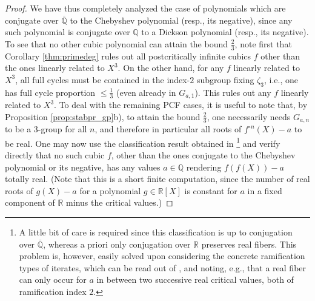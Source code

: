 \documentclass[a4paper]{amsart}
\begin{document}
\begin{proof}
  We have thus completely analyzed the case of polynomials which are conjugate over $\overline{\mathbb{Q}}$ to the Chebyshev polynomial (resp., its negative), since any such polynomial is conjugate over $\mathbb{Q}$ to a Dickson polynomial (resp., its negative). 
  To see that no other cubic polynomial can attain the bound $\frac{2}{3}$, note first that Corollary \ref{thm:primedeg} rules out all postcritically infinite  cubics $f$ other than the ones linearly related to $X^3$. On the other hand, for any $f$ linearly related to $X^3$, all full cycles must be contained in the index-$2$ subgroup fixing $\zeta_3$, i.e., one has full cycle proportion $\le \frac{1}{3}$ (even already in $G_{a,1}$). %
   This rules out any $f$ linearly related to $X^3$. To deal with the remaining PCF cases, it is useful to note that, by Proposition \ref{prop:stabpr_gp}b), to attain the bound $\frac{2}{3}$, one necessarily needs $G_{a,n}$ to be a $3$-group for all $n$, and therefore in particular all roots of $f^{\circ n}(X)-a$ to be real. One may now use the classification result obtained in \cite{AMT}\footnote{A little bit of care is required since this classification is up to conjugation over $\overline{\mathbb{Q}}$, whereas a priori only conjugation over $\mathbb{R}$ preserves real fibers. This problem is, however, easily solved upon considering the concrete ramification types of iterates, which can be read out of \cite[Table 1]{AMT}, and noting, e.g., that a real fiber can only occur for $a$ in between two successive real critical values, both of ramification index $2$.} and verify directly that no such cubic $f$, other than the ones conjugate to the Chebyshev polynomial or its negative, has any values $a\in \mathbb{Q}$ rendering $f(f(X))-a$ totally real. (Note that this is a short finite computation, since the number of real roots of $g(X)-a$ for a polynomial $g\in \mathbb{R}[X]$ is constant for $a$ in a fixed component of $\mathbb{R}$ minus the critical values.)
  \end{proof}
\end{document}
